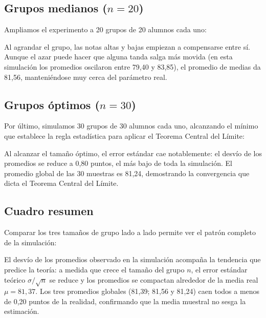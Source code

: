 
\subsection{Grupos medianos ($n = 20$)}
Ampliamos el experimento a 20 grupos de 20 alumnos cada uno:

\TablaDeDatos


 Al agrandar el grupo, las notas altas y bajas empiezan a
compensarse entre sí. Aunque el azar puede hacer que alguna tanda salga más movida (en esta
simulación los promedios oscilaron entre 79,40 y 83,85), el promedio de medias da 81,56,
manteniéndose muy cerca del parámetro real.


\subsection{Grupos óptimos ($n = 30$)}
Por último, simulamos 30 grupos de 30 alumnos cada uno, alcanzando el mínimo que establece la
regla estadística para aplicar el Teorema Central del Límite:

\TablaDeDatos


 Al alcanzar el tamaño óptimo, el error estándar cae
notablemente: el desvío de los promedios se reduce a 0,80 puntos, el más bajo de toda la
simulación. El promedio global de las 30 muestras es 81,24, demostrando la convergencia que
dicta el Teorema Central del Límite.

\subsection{Cuadro resumen}
Comparar los tres tamaños de grupo lado a lado permite ver el patrón completo de la simulación:



El desvío de los promedios observado en la simulación acompaña la tendencia que predice la
teoría: a medida que crece el tamaño del grupo $n$, el error estándar teórico
$\sigma / \sqrt{n}$ se reduce y los promedios se compactan alrededor de la media real
$\mu = 81{,}37$. Los tres promedios globales (81,39; 81,56 y 81,24) caen todos a menos de
0,20 puntos de la realidad, confirmando que la media muestral no sesga la estimación.

